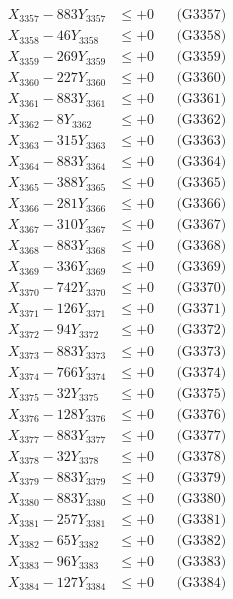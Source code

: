 \documentclass[a4paper,10pt]{article}
\begin{document}
{\begin{align}
X_{3357} - 883Y_{3357} &\leq +0 && \text{(G3357)} \\
X_{3358} - 46Y_{3358} &\leq +0 && \text{(G3358)} \\
X_{3359} - 269Y_{3359} &\leq +0 && \text{(G3359)} \\
X_{3360} - 227Y_{3360} &\leq +0 && \text{(G3360)} \\
\allowbreak
X_{3361} - 883Y_{3361} &\leq +0 && \text{(G3361)} \\
X_{3362} - 8Y_{3362} &\leq +0 && \text{(G3362)} \\
X_{3363} - 315Y_{3363} &\leq +0 && \text{(G3363)} \\
X_{3364} - 883Y_{3364} &\leq +0 && \text{(G3364)} \\
X_{3365} - 388Y_{3365} &\leq +0 && \text{(G3365)} \\
X_{3366} - 281Y_{3366} &\leq +0 && \text{(G3366)} \\
X_{3367} - 310Y_{3367} &\leq +0 && \text{(G3367)} \\
X_{3368} - 883Y_{3368} &\leq +0 && \text{(G3368)} \\
X_{3369} - 336Y_{3369} &\leq +0 && \text{(G3369)} \\
X_{3370} - 742Y_{3370} &\leq +0 && \text{(G3370)} \\
\allowbreak
X_{3371} - 126Y_{3371} &\leq +0 && \text{(G3371)} \\
X_{3372} - 94Y_{3372} &\leq +0 && \text{(G3372)} \\
X_{3373} - 883Y_{3373} &\leq +0 && \text{(G3373)} \\
X_{3374} - 766Y_{3374} &\leq +0 && \text{(G3374)} \\
X_{3375} - 32Y_{3375} &\leq +0 && \text{(G3375)} \\
X_{3376} - 128Y_{3376} &\leq +0 && \text{(G3376)} \\
X_{3377} - 883Y_{3377} &\leq +0 && \text{(G3377)} \\
X_{3378} - 32Y_{3378} &\leq +0 && \text{(G3378)} \\
X_{3379} - 883Y_{3379} &\leq +0 && \text{(G3379)} \\
X_{3380} - 883Y_{3380} &\leq +0 && \text{(G3380)} \\
\allowbreak
X_{3381} - 257Y_{3381} &\leq +0 && \text{(G3381)} \\
X_{3382} - 65Y_{3382} &\leq +0 && \text{(G3382)} \\
X_{3383} - 96Y_{3383} &\leq +0 && \text{(G3383)} \\
X_{3384} - 127Y_{3384} &\leq +0 && \text{(G3384)} \\

\end{align}}
\end{document}
